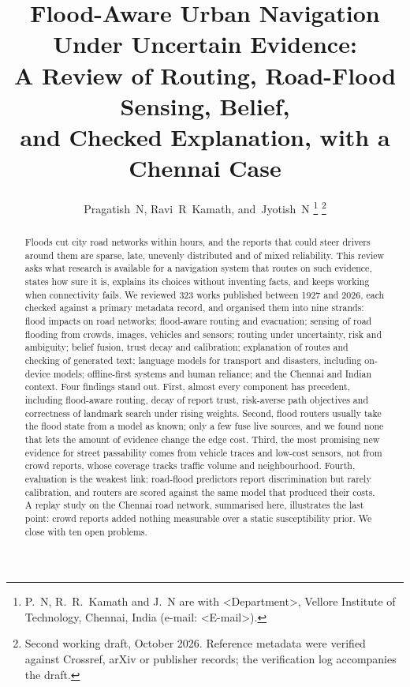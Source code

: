 \documentclass[journal]{IEEEtran}
\begin{document}

\title{Flood-Aware Urban Navigation Under Uncertain Evidence:\\ A Review of Routing, Road-Flood Sensing, Belief,\\ and Checked Explanation, with a Chennai Case}

\author{Pragatish~N,
        Ravi~R~Kamath,
        and~Jyotish~N%
\thanks{P.~N, R.~R.~Kamath and J.~N are with \textless Department\textgreater, Vellore Institute of Technology, Chennai, India (e-mail: \textless E-mail\textgreater).}%
\thanks{Second working draft, October 2026. Reference metadata were verified against Crossref, arXiv or publisher records; the verification log accompanies the draft.}}


\maketitle

\begin{abstract}
Floods cut city road networks within hours, and the reports that could steer drivers around them are sparse, late, unevenly distributed and of mixed reliability. This review asks what research is available for a navigation system that routes on such evidence, states how sure it is, explains its choices without inventing facts, and keeps working when connectivity fails. We reviewed 323 works published between 1927 and 2026, each checked against a primary metadata record, and organised them into nine strands: flood impacts on road networks; flood-aware routing and evacuation; sensing of road flooding from crowds, images, vehicles and sensors; routing under uncertainty, risk and ambiguity; belief fusion, trust decay and calibration; explanation of routes and checking of generated text; language models for transport and disasters, including on-device models; offline-first systems and human reliance; and the Chennai and Indian context. Four findings stand out. First, almost every component has precedent, including flood-aware routing, decay of report trust, risk-averse path objectives and correctness of landmark search under rising weights. Second, flood routers usually take the flood state from a model as known; only a few fuse live sources, and we found none that lets the amount of evidence change the edge cost. Third, the most promising new evidence for street passability comes from vehicle traces and low-cost sensors, not from crowd reports, whose coverage tracks traffic volume and neighbourhood. Fourth, evaluation is the weakest link: road-flood predictors report discrimination but rarely calibration, and routers are scored against the same model that produced their costs. A replay study on the Chennai road network, summarised here, illustrates the last point: crowd reports added nothing measurable over a static susceptibility prior. We close with ten open problems.
\end{abstract}
\end{document}
